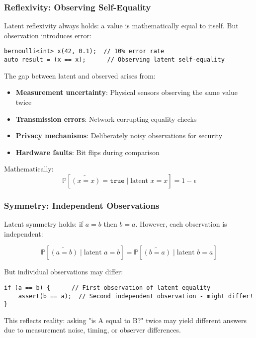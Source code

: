 \documentclass[11pt,final,hidelinks]{article}
\newcommand{\obs}[1]{\widetilde{#1}}  %
\newcommand{\True}{\mathtt{true}}
\newcommand{\ProbCond}[2]{\mathbb{P}\left[#1 \mid #2\right]}
\begin{document}
\subsubsection{Reflexivity: Observing Self-Equality}

Latent reflexivity always holds: a value is mathematically equal to itself. But observation introduces error:

\begin{verbatim}
bernoulli<int> x(42, 0.1);  // 10% error rate
auto result = (x == x);      // Observing latent self-equality
\end{verbatim}

The gap between latent and observed arises from:
\begin{itemize}
    \item \textbf{Measurement uncertainty}: Physical sensors observing the same value twice
    \item \textbf{Transmission errors}: Network corrupting equality checks
    \item \textbf{Privacy mechanisms}: Deliberately noisy observations for security
    \item \textbf{Hardware faults}: Bit flips during comparison
\end{itemize}

Mathematically:
\begin{equation}
\ProbCond{\obs{(x = x)} = \True}{\text{latent } x = x} = 1 - \epsilon
\end{equation}

\subsubsection{Symmetry: Independent Observations}

Latent symmetry holds: if $a = b$ then $b = a$. However, each observation is independent:

\begin{equation}
\ProbCond{\obs{(a = b)}}{\text{latent } a = b} = \ProbCond{\obs{(b = a)}}{\text{latent } b = a}
\end{equation}

But individual observations may differ:
\begin{verbatim}
if (a == b) {      // First observation of latent equality
    assert(b == a);  // Second independent observation - might differ!
}
\end{verbatim}

This reflects reality: asking "is A equal to B?" twice may yield different answers due to measurement noise, timing, or observer differences.
\end{document}
